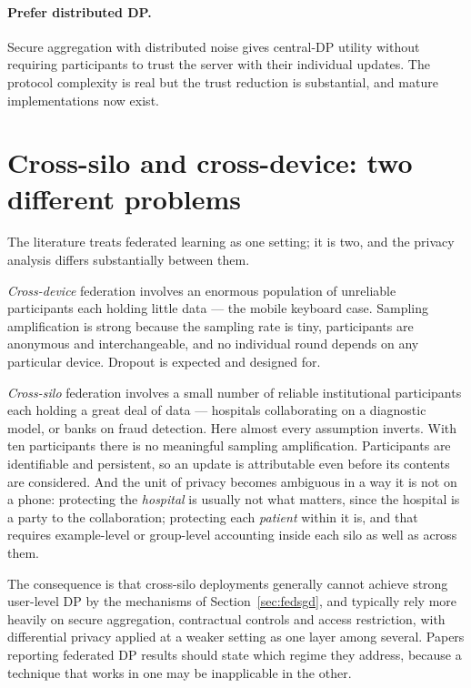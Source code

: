 \documentclass[11pt,a4paper]{article}
\begin{document}
\paragraph{Prefer distributed DP.}
Secure aggregation with distributed noise gives central-DP utility without
requiring participants to trust the server with their individual updates. The
protocol complexity is real but the trust reduction is substantial, and mature
implementations now exist.

\section{Cross-silo and cross-device: two different problems}
\label{sec:silo}

The literature treats federated learning as one setting; it is two, and the
privacy analysis differs substantially between them.

\emph{Cross-device} federation involves an enormous population of unreliable
participants each holding little data --- the mobile keyboard case. Sampling
amplification is strong because the sampling rate is tiny, participants are
anonymous and interchangeable, and no individual round depends on any
particular device. Dropout is expected and designed for.

\emph{Cross-silo} federation involves a small number of reliable institutional
participants each holding a great deal of data --- hospitals collaborating on a
diagnostic model, or banks on fraud detection. Here almost every assumption
inverts. With ten participants there is no meaningful sampling amplification.
Participants are identifiable and persistent, so an update is attributable
even before its contents are considered. And the unit of privacy becomes
ambiguous in a way it is not on a phone: protecting the \emph{hospital} is
usually not what matters, since the hospital is a party to the collaboration;
protecting each \emph{patient} within it is, and that requires example-level
or group-level accounting inside each silo as well as across them.

The consequence is that cross-silo deployments generally cannot achieve strong
user-level DP by the mechanisms of Section~\ref{sec:fedsgd}, and typically
rely more heavily on secure aggregation, contractual controls and access
restriction, with differential privacy applied at a weaker setting as one
layer among several. Papers reporting federated DP results should state which
regime they address, because a technique that works in one may be inapplicable
in the other.
\end{document}
